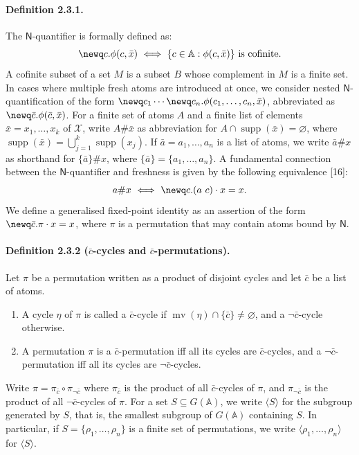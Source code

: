 \paragraph{Definition 2.3.1.} The $\mathsf N$-quantifier is formally defined as:
\[
\newq c.\phi(c,\bar x)\ \Longleftrightarrow\ \{c\in\mathbb A:\phi(c,\bar x)\}\text{ is cofinite}.
\]
A cofinite subset of a set $M$ is a subset $B$ whose complement in $M$ is a finite set.
In cases where multiple fresh atoms are introduced at once, we consider nested $\mathsf N$-quantification of the form $\newq c_1\cdots\newq c_n.\phi(c_1,\ldots,c_n,\bar x)$, abbreviated as $\newq\bar c.\phi(\bar c,\bar x)$.
For a finite set of atoms $A$ and a finite list of elements $\bar x=x_1,\ldots,x_k$ of $\mathcal X$, write $A\#\bar x$ as abbreviation for $A\cap\operatorname{supp}(\bar x)=\varnothing$, where $\operatorname{supp}(\bar x)=\bigcup_{j=1}^k\operatorname{supp}(x_j)$.
If $\bar a=a_1,\ldots,a_n$ is a list of atoms, we write $\bar a\#x$ as shorthand for $\{\bar a\}\#x$, where $\{\bar a\}=\{a_1,\ldots,a_n\}$.
A fundamental connection between the $\mathsf N$-quantifier and freshness is given by the following equivalence [16]:
\[
a\#x\ \Longleftrightarrow\ \newq c.(a\ c)\cdot x=x.
\]
We define a generalised fixed-point identity as an assertion of the form $\newq\bar c.\pi\cdot x=x$, where $\pi$ is a permutation that may contain atoms bound by $\mathsf N$.
\paragraph{Definition 2.3.2 ($\bar c$-cycles and $\bar c$-permutations).}
Let $\pi$ be a permutation written as a product of disjoint cycles and let $\bar c$ be a list of atoms.
\begin{enumerate}
\item A cycle $\eta$ of $\pi$ is called a $\bar c$-cycle if $\operatorname{mv}(\eta)\cap\{\bar c\}\ne\varnothing$, and a $\neg\bar c$-cycle otherwise.
\item A permutation $\pi$ is a $\bar c$-permutation iff all its cycles are $\bar c$-cycles, and a $\neg\bar c$-permutation iff all its cycles are $\neg\bar c$-cycles.
\end{enumerate}
Write $\pi=\pi_{\bar c}\circ\pi_{\neg\bar c}$ where $\pi_{\bar c}$ is the product of all $\bar c$-cycles of $\pi$, and $\pi_{\neg\bar c}$ is the product of all $\neg\bar c$-cycles of $\pi$.
For a set $S\subseteq G(\mathbb A)$, we write $\langle S\rangle$ for the subgroup generated by $S$, that is, the smallest subgroup of $G(\mathbb A)$ containing $S$.
In particular, if $S=\{\rho_1,\ldots,\rho_n\}$ is a finite set of permutations, we write $\langle\rho_1,\ldots,\rho_n\rangle$ for $\langle S\rangle$.

